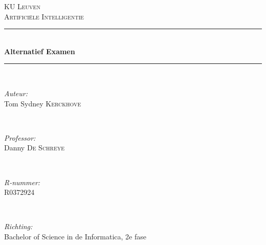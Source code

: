 \documentclass[10pt]{report}
\begin{document}
\begin{titlepage}


\thispagestyle{empty} %


\newcommand{\HRule}{\rule{\linewidth}{0.5mm}} %

\center %
 

\textsc{\LARGE KU Leuven}\\[1.5cm]
\textsc{\Large Artifici\"ele Intelligentie}\\[0.5cm]


\HRule \\[0.4cm]
{ \Huge \bfseries Alternatief Examen}\\
\HRule \\[2cm]
 

\begin{minipage}{0.4\textwidth}
\begin{flushleft} \large
\emph{Auteur:}\\
Tom Sydney \textsc{Kerckhove}
\end{flushleft}
\end{minipage}
~
\begin{minipage}{0.4\textwidth}
\begin{flushright} \large
\emph{Professor:} \\
Danny \textsc{De Schreye}
\end{flushright}
\end{minipage}\\[1cm]

\begin{minipage}{0.4\textwidth}
\begin{flushleft} \large
\emph{R-nummer:}\\
R0372924
\end{flushleft}
\end{minipage}
~
\begin{minipage}{0.4\textwidth}
\begin{flushright} \large
\emph{Richting:} \\
Bachelor of Science in de Informatica, 2e fase
\end{flushright}
\end{minipage}


\end{titlepage}
\end{document}
